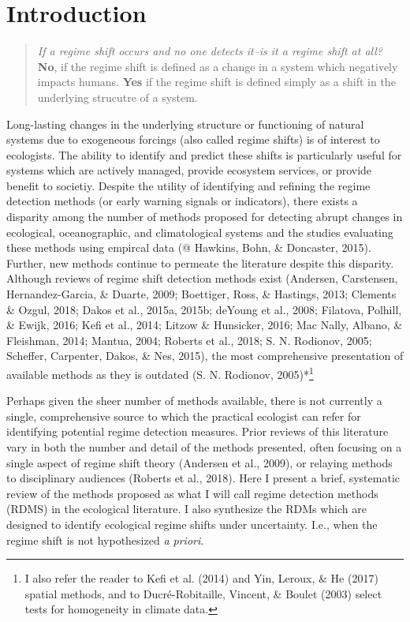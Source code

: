 \documentclass[12pt,twoside,openany]{reedthesis}
\begin{document}
\hypertarget{introduction}{%
\section{Introduction}\label{introduction}}
\begin{quote}
\emph{If a regime shift occurs and no one detects it--is it a regime shift at all?}
\textbf{No}, if the regime shift is defined as a change in a system which negatively impacts humans. \textbf{Yes} if the regime shift is defined simply as a shift in the underlying strucutre of a system.
\end{quote}
Long-lasting changes in the underlying structure or functioning of natural systems due to exogeneous forcings (also called regime shifts) is of interest to ecologists. The ability to identify and predict these shifts is particularly useful for systems which are actively managed, provide ecosystem services, or provide benefit to societiy. Despite the utility of identifying and refining the regime detection methods (or early warning signals or indicators), there exists a disparity among the number of methods proposed for detecting abrupt changes in ecological, oceanographic, and climatological systems and the studies evaluating these methods using empircal data (@ Hawkins, Bohn, \& Doncaster, 2015). Further, new methods continue to permeate the literature despite this disparity. Although reviews of regime shift detection methods exist (Andersen, Carstensen, Hernandez-Garcia, \& Duarte, 2009; Boettiger, Ross, \& Hastings, 2013; Clements \& Ozgul, 2018; Dakos et al., 2015a, 2015b; deYoung et al., 2008; Filatova, Polhill, \& Ewijk, 2016; Kefi et al., 2014; Litzow \& Hunsicker, 2016; Mac Nally, Albano, \& Fleishman, 2014; Mantua, 2004; Roberts et al., 2018; S. N. Rodionov, 2005; Scheffer, Carpenter, Dakos, \& Nes, 2015), the most comprehensive presentation of available methods as they is outdated (S. N. Rodionov, 2005)*\footnote{I also refer the reader to Kefi et al. (2014) and Yin, Leroux, \& He (2017) spatial methods, and to Ducré-Robitaille, Vincent, \& Boulet (2003) select tests for homogeneity in climate data.}

Perhaps given the sheer number of methods available, there is not currently a single, comprehensive source to which the practical ecologist can refer for identifying potential regime detection measures. Prior reviews of this literature vary in both the number and detail of the methods presented, often focusing on a single aspect of regime shift theory (Andersen et al., 2009), or relaying methods to disciplinary audiences (Roberts et al., 2018). Here I present a brief, systematic review of the methods proposed as what I will call regime detection methods (RDMS) in the ecological literature. I also synthesize the RDMs which are designed to identify ecological regime shifts under uncertainty. I.e., when the regime shift is not hypothesized \emph{a priori}.
\end{document}

